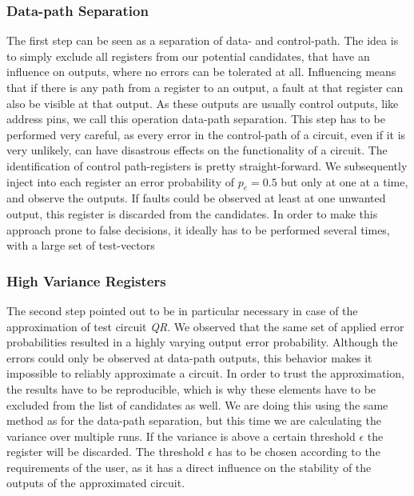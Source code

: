 \documentclass[10pt,twocolumn]{IEEEtran} %
\begin{document}
\subsubsection{\bf{Data-path Separation}}
The first step can be seen as a separation of data- and control-path. The idea is to simply exclude all registers from our potential candidates, that have an influence on outputs, where no errors can be tolerated at all. Influencing means that if there is any path from a register to an output, a fault at that register can also be visible at that output. As these outputs are usually control outputs, like address pins, we call this operation data-path separation. This step has to be performed very careful, as every error in the control-path of a circuit, even if it is very unlikely, can have disastrous effects on the functionality of a circuit. The identification of control path-registers is pretty straight-forward. We subsequently inject into each register an error probability of $p_e=0.5$ but only at one at a time, and observe the outputs. If faults could be observed at least at one unwanted output, this register is discarded from the candidates. In order to make this approach prone to false decisions, it ideally has to be performed several times, with a large set of test-vectors \cite{may2014improving}
\subsubsection{\bf{High Variance Registers}}
\label{subsubsec:high_v}
The second step pointed out to be in particular necessary in case of the approximation of test circuit \emph{QR}. We observed that the same set of applied error probabilities resulted in a highly varying output error probability. Although the errors could only be observed at data-path outputs, this behavior makes it impossible to reliably approximate a circuit. In order to trust the approximation, the results have to be reproducible, which is why these elements have to be excluded from the list of candidates as well. We are doing this using the same method as for the data-path separation, but this time we are calculating the variance over multiple runs. If the variance is above a certain threshold $\epsilon$ the register will be discarded. The threshold $\epsilon$ has to be chosen according to the requirements of the user, as it has a direct influence on the stability of the outputs of the approximated circuit.
\end{document}
